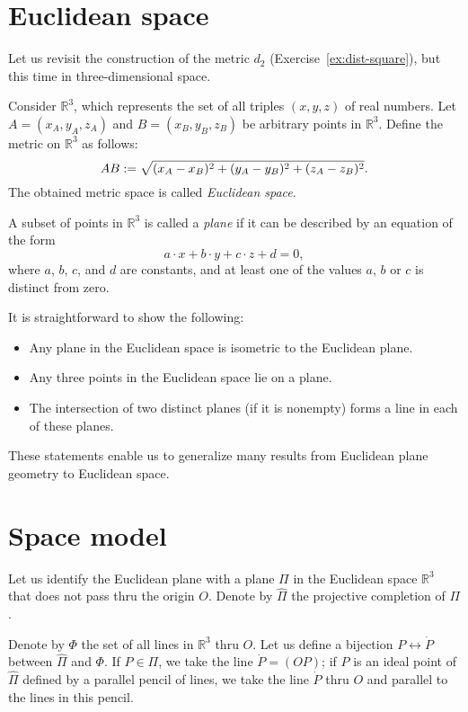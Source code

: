 \section{Euclidean space}

Let us revisit the construction of the metric $d_2$ (Exercise~\ref{ex:dist-square}), but this time in three-dimensional space. 

Consider $\mathbb{R}^3$, which represents the set of all triples $(x,y,z)$ of real numbers.
Let  $A=(x_A,y_A,z_A)$ and $B=(x_B,y_B,z_B)$ be arbitrary points in $\mathbb{R}^3$.
Define the metric on $\mathbb{R}^3$ as follows:
$$AB
:=
\sqrt{(x_A-x_B)^2+(y_A-y_B)^2+(z_A-z_B)^2}.$$
The obtained metric space is called \emph{Euclidean space}.

A subset of points in $\mathbb{R}^3$ is called a \emph{plane} if it can be
described by an equation of the form
$$a\cdot x+b\cdot y+c\cdot z+d=0,$$ 
where $a$, $b$, $c$, and $d$ are constants, and at least one of the values $a$, $b$ or $c$ is distinct from zero.

It is straightforward to show the following:
\begin{itemize}
 \item Any plane in the Euclidean space is isometric to the Euclidean plane.
 \item Any three points in the Euclidean space lie on a plane.
 \item The  intersection of two distinct planes (if it is nonempty) forms a line in each of these planes.
\end{itemize}

These statements enable us to generalize many results from Euclidean plane geometry to Euclidean space.

\section{Space model}

Let us identify the Euclidean plane with a plane $\Pi$ in the Euclidean space $\mathbb{R}^3$ that does not pass thru the origin $O$.
Denote by $\hat\Pi$ the projective completion of $\Pi$.

Denote by $\Phi$ the set of all lines in $\mathbb{R}^3$ thru $O$.
Let us define a bijection $P\leftrightarrow \dot P$ between $\hat \Pi$ and $\Phi$.
If $P\in \Pi$, we take the line $\dot P=(OP)$;
if $P$ is an ideal point of $\hat \Pi$ defined by a parallel pencil of lines, we take the line $\dot P$ thru $O$ and parallel to the lines in this pencil.


